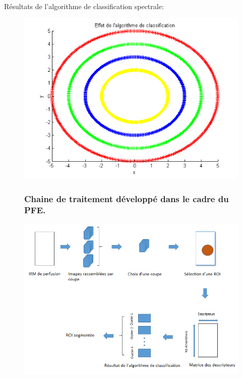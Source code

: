 \documentclass{beamer}
\begin{document}
\begin{frame}

Résultats de l'algorithme de classification spectrale:

\begin{figure}
\centering
\includegraphics[scale=0.5,angle=0]{AlgoClssification.png}
\label{fig:MA} 
\end{figure}

\end{frame}

\begin{frame}

\begin{figure}

\frametitle{Chaine de traitement développé dans le cadre du PFE.}
\centering
    \includegraphics[scale=0.5,angle=0]{Processing_toolchain.png}
    \label{fig:Chaine} 
    
\end{figure}

\end{frame}
\end{document}
